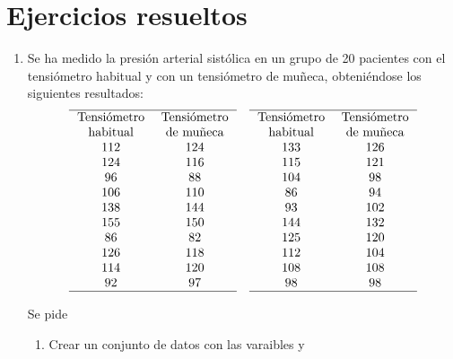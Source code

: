 \section{Ejercicios resueltos}
\begin{enumerate}[leftmargin=*]
\item Se ha medido la presión arterial sistólica en un grupo de 20 pacientes con el tensiómetro habitual y con un
tensiómetro de muñeca, obteniéndose los siguientes resultados:
\[
\begin{array}{cc}
\hline
\multicolumn{1}{p{2cm}}{\centering \text{Tensiómetro} \text{habitual}} & \multicolumn{1}{p{2cm}}{\centering \text{Tensiómetro} \text{de
muñeca}} \\ 
112 & 124 \\ 
124 & 116 \\
 96 &  88 \\
106 & 110 \\
138 & 144 \\
155 & 150 \\
 86 &  82 \\
126 & 118 \\
114 & 120 \\
 92 &  97 \\
\hline
\end{array}
\quad
\begin{array}{cc}
\hline
\multicolumn{1}{p{2cm}}{\centering \text{Tensiómetro} \text{habitual}} & \multicolumn{1}{p{2cm}}{\centering \text{Tensiómetro} \text{de
muñeca}} \\ 
133 & 126 \\
115 & 121 \\
104 &  98 \\
 86 &  94 \\
 93 & 102 \\
144 & 132 \\
125 & 120 \\
112 & 104 \\
108 & 108 \\
 98 &  98 \\
\hline
\end{array}
\]

Se pide
\begin{enumerate}
\item Crear un conjunto de datos con las varaibles  y 
\end{enumerate}
\end{enumerate}
